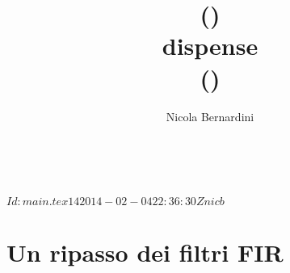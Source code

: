 \documentclass{scrbook}
\title{\topic (\topicacro) \level\\dispense\\{\tiny (\rcstag)}}
\author{Nicola Bernardini}
\date{~}
\newcommand{\rootdir}{..}
\begin{document}
\svnInfo $Id: main.tex 14 2014-02-04 22:36:30Z nicb $

\maketitle

\tableofcontents


\chapter{Un ripasso dei filtri FIR\label{chap:fir}}








\end{document}
